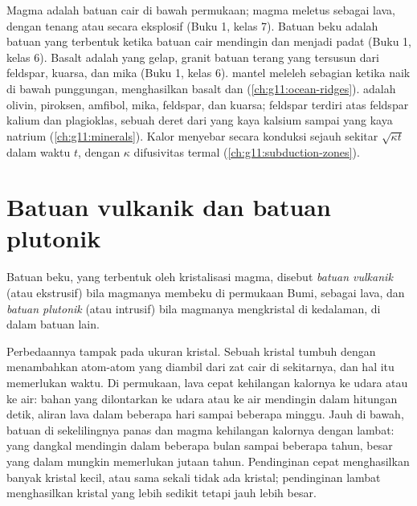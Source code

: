 \begin{recall}
Magma adalah batuan cair di bawah permukaan; magma meletus sebagai lava, dengan
tenang atau secara eksplosif (Buku 1, kelas 7). Batuan beku adalah batuan yang
terbentuk ketika batuan cair mendingin dan menjadi padat (Buku 1, kelas 6).
Basalt adalah  yang gelap, granit batuan terang yang tersusun
dari feldspar, kuarsa, dan mika (Buku 1, kelas 6).  mantel meleleh
sebagian ketika naik di bawah punggungan, menghasilkan basalt dan   (\cref{ch:g11:ocean-ridges}).  adalah olivin,
piroksen, amfibol, mika, feldspar, dan kuarsa; feldspar terdiri atas feldspar
kalium dan plagioklas, sebuah deret dari yang kaya kalsium sampai yang kaya
natrium (\cref{ch:g11:minerals}). Kalor menyebar secara konduksi sejauh sekitar
$\sqrt{\kappa t}$ dalam waktu $t$, dengan $\kappa$ difusivitas termal
(\cref{ch:g11:subduction-zones}).
\end{recall}

\section{Batuan vulkanik dan batuan plutonik}

\begin{definition}\label{def:g11:igneous-rocks:volcanic-plutonic}
Batuan beku, yang terbentuk oleh kristalisasi magma, disebut
\emph{batuan vulkanik}
(atau ekstrusif) bila magmanya membeku di permukaan Bumi, sebagai lava, dan
\emph{batuan plutonik} (atau intrusif) bila magmanya
mengkristal di kedalaman, di dalam batuan lain.
\end{definition}

Perbedaannya tampak pada ukuran kristal. Sebuah kristal tumbuh dengan
menambahkan atom-atom yang diambil dari zat cair di sekitarnya, dan hal itu
memerlukan waktu. Di permukaan, lava cepat kehilangan kalornya ke udara atau ke
air: bahan yang dilontarkan ke udara atau ke air mendingin dalam hitungan detik,
aliran lava dalam beberapa hari sampai beberapa minggu. Jauh di bawah, batuan di
sekelilingnya panas dan magma kehilangan kalornya dengan lambat:  yang
dangkal mendingin dalam beberapa bulan sampai beberapa tahun,  besar yang
dalam mungkin memerlukan jutaan tahun. Pendinginan cepat menghasilkan banyak
kristal kecil, atau sama sekali tidak ada kristal; pendinginan lambat
menghasilkan kristal yang lebih sedikit tetapi jauh lebih besar.

